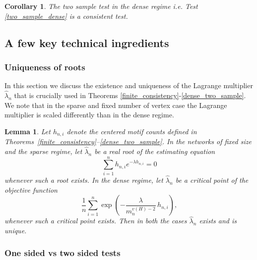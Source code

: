 \documentclass[12pt]{article}
\numberwithin{equation}{section}
\newtheorem{corollary}{Corollary}[section]
\newtheorem{lemma}{Lemma}[section]
\begin{document}
\begin{corollary}
    The two sample test in the dense regime i.e. Test \ref{two_sample_dense} is a consistent test.
\end{corollary}

\subsection{A few key technical ingredients \label{tech_ingre}}

\subsubsection{Uniqueness of roots }

In this section we discuss the existence and uniqueness of the Lagrange multiplier $\hat{\lambda}_n$ that is crucially used in Theorems \ref{finite_consistency}-\ref{dense_two_sample}. We note that in the sparse and fixed number of vertex case the Lagrange multiplier is scaled differently than in the dense regime.

\begin{lemma}{\label{exis_uniq}}
Let $h_{n,i}$ denote the centered motif counts defined in
Theorems~\ref{finite_consistency}--\ref{dense_two_sample}.
In the networks of fixed size and the sparse regime, let $\hat{\lambda}_n$ be a real root of the estimating equation
\[
\sum_{i=1}^n h_{n,i} e^{-\lambda h_{n,i}} = 0
\]
whenever such a root exists.
In the dense regime, let $\hat{\lambda}_n$ be a critical point of the objective function
\[
\frac{1}{n} \sum_{i=1}^n 
\exp\!\left(-\frac{\lambda}{m_n^{v(H)-2}}\, h_{n,i}\right),
\]
whenever such a critical point exists.
Then in both the cases $\hat{\lambda}_n$ exists and is unique.

\end{lemma}
\subsubsection{One sided vs two sided tests}
\end{document}
